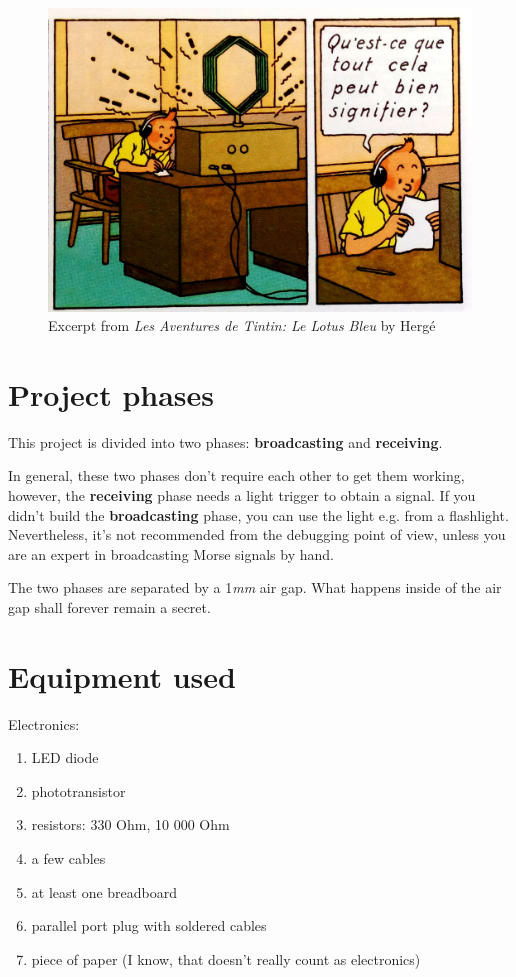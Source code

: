 \documentclass[12pt]{report}
\begin{document}
\begin{figure}[H]
\centering\includegraphics[scale=0.1]{le_lotus_bleu}
\caption{Excerpt from \textit{Les Aventures de Tintin: Le Lotus Bleu} by Hergé}			
\label{fig:tintin}
\end{figure}


\section{Project phases}

This project is divided into two phases: \textbf{broadcasting} and \textbf{receiving}. 

In general, these two phases don't require each other to get them working, however, the \textbf{receiving} phase needs a light trigger to obtain a signal. If you didn't build the  \textbf{broadcasting} phase, you can use the light e.g. from a flashlight. Nevertheless, it's not recommended from the debugging point of view, unless you are an expert in broadcasting Morse signals by hand.

The two phases are separated by a 1\textit{mm} air gap. What happens inside of the air gap shall forever remain a secret.

\section{Equipment used} \label{sec:equip}

Electronics:

\begin{enumerate}

\item LED diode
\item phototransistor
\item resistors: 330 Ohm, 10 000 Ohm
\item a few cables
\item at least one breadboard
\item parallel port plug with soldered cables
\item piece of paper (I know, that doesn't really count as electronics)

\end{enumerate}
\end{document}
